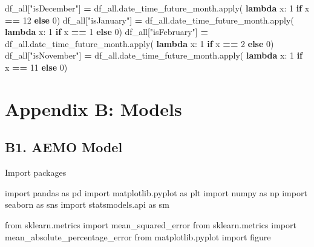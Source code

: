 \documentclass[mstat,12pt]{unswthesis}
\newenvironment{Shaded}{\begin{snugshade}}{\end{snugshade}}
\newcommand{\BuiltInTok}[1]{#1}
\newcommand{\ControlFlowTok}[1]{\textcolor[rgb]{0.13,0.29,0.53}{\textbf{#1}}}
\newcommand{\DecValTok}[1]{\textcolor[rgb]{0.00,0.00,0.81}{#1}}
\newcommand{\ImportTok}[1]{#1}
\newcommand{\KeywordTok}[1]{\textcolor[rgb]{0.13,0.29,0.53}{\textbf{#1}}}
\newcommand{\NormalTok}[1]{#1}
\newcommand{\OperatorTok}[1]{\textcolor[rgb]{0.81,0.36,0.00}{\textbf{#1}}}
\newcommand{\StringTok}[1]{\textcolor[rgb]{0.31,0.60,0.02}{#1}}
\begin{document}
\begin{Shaded}
\begin{Highlighting}[]
\NormalTok{df\_all[}\StringTok{"isDecember"}\NormalTok{] }\OperatorTok{=}\NormalTok{ df\_all.date\_time\_future\_month.}\BuiltInTok{apply}\NormalTok{(}
    \KeywordTok{lambda}\NormalTok{ x: }\DecValTok{1} \ControlFlowTok{if}\NormalTok{ x }\OperatorTok{==} \DecValTok{12} \ControlFlowTok{else} \DecValTok{0}\NormalTok{)}
\NormalTok{df\_all[}\StringTok{"isJanuary"}\NormalTok{] }\OperatorTok{=}\NormalTok{ df\_all.date\_time\_future\_month.}\BuiltInTok{apply}\NormalTok{(}
    \KeywordTok{lambda}\NormalTok{ x: }\DecValTok{1} \ControlFlowTok{if}\NormalTok{ x }\OperatorTok{==} \DecValTok{1} \ControlFlowTok{else} \DecValTok{0}\NormalTok{)}
\NormalTok{df\_all[}\StringTok{"isFebruary"}\NormalTok{] }\OperatorTok{=}\NormalTok{ df\_all.date\_time\_future\_month.}\BuiltInTok{apply}\NormalTok{(}
    \KeywordTok{lambda}\NormalTok{ x: }\DecValTok{1} \ControlFlowTok{if}\NormalTok{ x }\OperatorTok{==} \DecValTok{2} \ControlFlowTok{else} \DecValTok{0}\NormalTok{)}
\NormalTok{df\_all[}\StringTok{"isNovember"}\NormalTok{] }\OperatorTok{=}\NormalTok{ df\_all.date\_time\_future\_month.}\BuiltInTok{apply}\NormalTok{(}
    \KeywordTok{lambda}\NormalTok{ x: }\DecValTok{1} \ControlFlowTok{if}\NormalTok{ x }\OperatorTok{==} \DecValTok{11} \ControlFlowTok{else} \DecValTok{0}\NormalTok{)}
\end{Highlighting}
\end{Shaded}

\newpage

\section*{Appendix B: Models}\label{appendix-b-models}

\subsection*{B1. AEMO Model}\label{b1.-aemo-model}

Import packages

\begin{Shaded}
\begin{Highlighting}[]
\ImportTok{import}\NormalTok{ pandas }\ImportTok{as}\NormalTok{ pd}
\ImportTok{import}\NormalTok{ matplotlib.pyplot }\ImportTok{as}\NormalTok{ plt}
\ImportTok{import}\NormalTok{ numpy }\ImportTok{as}\NormalTok{ np}
\ImportTok{import}\NormalTok{ seaborn }\ImportTok{as}\NormalTok{ sns}
\ImportTok{import}\NormalTok{ statsmodels.api }\ImportTok{as}\NormalTok{ sm}

\ImportTok{from}\NormalTok{ sklearn.metrics }\ImportTok{import}\NormalTok{ mean\_squared\_error}
\ImportTok{from}\NormalTok{ sklearn.metrics }\ImportTok{import}\NormalTok{ mean\_absolute\_percentage\_error}
\ImportTok{from}\NormalTok{ matplotlib.pyplot }\ImportTok{import}\NormalTok{ figure}
\end{Highlighting}
\end{Shaded}
\end{document}
